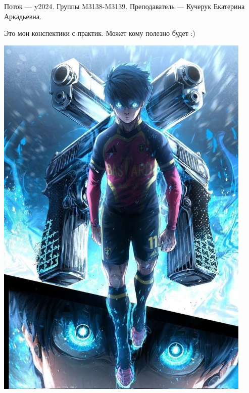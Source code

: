 Поток — y2024.\newline
Группы M3138-M3139.\newline
Преподаватель --- Кучерук Екатерина Аркадьевна.\par

Это мои конспектики с практик. Может кому полезно будет :)
\begin{center}
   \includegraphics[height=18cm]{assets/egoist.jpg}
\end{center}
